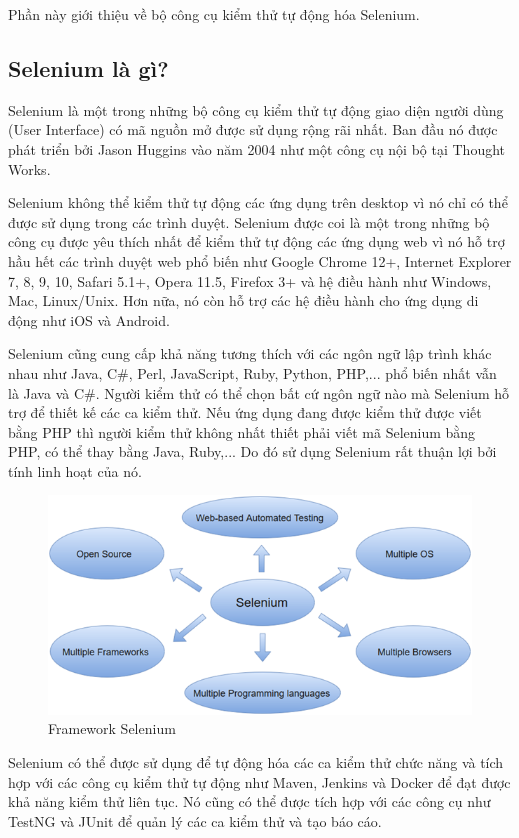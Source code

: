 \documentclass[./../main_file.tex]{subfiles}
\begin{document}
	
	Phần này giới thiệu về bộ công cụ kiểm thử tự động hóa Selenium.
	
	\subsection{Selenium là gì?}
	
	Selenium là một trong những bộ công cụ kiểm thử tự động giao diện người dùng (User Interface) có mã nguồn mở được sử dụng rộng rãi nhất. Ban đầu nó được phát triển bởi Jason Huggins vào năm 2004 như một công cụ nội bộ tại Thought Works.
	
	Selenium không thể kiểm thử tự động các ứng dụng trên desktop vì nó chỉ có thể được sử dụng trong các trình duyệt. Selenium được coi là một trong những bộ công cụ được yêu thích nhất để kiểm thử tự động các ứng dụng web vì nó hỗ trợ hầu hết các trình duyệt web phổ biến như Google Chrome 12+, Internet Explorer 7, 8, 9, 10, Safari 5.1+, Opera 11.5, Firefox 3+ và hệ điều hành như Windows, Mac, Linux/Unix. Hơn nữa, nó còn hỗ trợ các hệ điều hành cho ứng dụng di động như iOS và Android.
	
	Selenium cũng cung cấp khả năng tương thích với các ngôn ngữ lập trình khác nhau như Java, C\#, Perl, JavaScript, Ruby, Python, PHP,... phổ biến nhất vẫn là Java và C\#. Người kiểm thử có thể chọn bất cứ ngôn ngữ nào mà Selenium hỗ trợ để thiết kế các ca kiểm thử. Nếu ứng dụng đang được kiểm thử được viết bằng PHP thì người kiểm thử không nhất thiết phải viết mã Selenium bằng PHP, có thể thay bằng Java, Ruby,... Do đó sử dụng Selenium rất thuận lợi bởi tính linh hoạt của nó.
	
	\begin{figure}[H]
		\centering
		\includegraphics[width=\linewidth]{./images/image1.png}
		\caption{Framework Selenium}
	\end{figure}
	
	Selenium có thể được sử dụng để tự động hóa các ca kiểm thử chức năng và tích hợp với các công cụ kiểm thử tự động như Maven, Jenkins và Docker để đạt được khả năng kiểm thử liên tục. Nó cũng có thể được tích hợp với các công cụ như TestNG và JUnit để quản lý các ca kiểm thử và tạo báo cáo.
	
\end{document}
